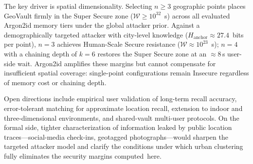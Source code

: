 \documentclass[mathematics,article,accept,pdftex,moreauthors]{Definitions/mdpi}
\begin{document}
{The key driver is spatial dimensionality. Selecting $n \geq 3$ geographic points places GeoVault firmly in the Super Secure zone ($\mathcal{W} \geq 10^{32}$~s) across all evaluated Argon2id memory tiers under the global attacker prior. Against a demographically targeted attacker with city-level knowledge ($H_\text{anchor} \approx 27.4$~bits per point), $n=3$ achieves Human-Scale Secure resistance ($\mathcal{W} \approx 10^{23}$~s); $n=4$ with a chaining depth of $k=6$ restores the Super Secure zone at an $\approx$8\,s user-side wait. Argon2id amplifies these margins but cannot compensate for insufficient spatial coverage: single-point configurations remain Insecure regardless of memory cost or chaining depth.}

{Open directions include empirical user validation of long-term recall accuracy, error-tolerant matching for approximate location recall, extension to indoor and three-dimensional environments, and shared-vault multi-user protocols. On the formal side, tighter characterization of information leaked by public location traces---social-media check-ins, geotagged photographs---would sharpen the targeted attacker model and clarify the conditions under which urban clustering fully eliminates the security margins \mbox{computed here.}}
\end{document}
